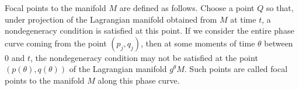 Focal points to the manifold $M$ are defined as follows. Choose a point $Q$ so that, under projection of the Lagrangian manifold obtained from $M$ at time $t$, a nondegeneracy condition is satisfied at this point. If we consider the entire phase curve coming from the point $(p_j, q_j)$, then at some moments of time $\theta$ between $0$ and $t$, the nondegeneracy condition may not be satisfied at the point $(p(\theta), q(\theta))$ of the Lagrangian manifold $g^\theta M$. Such points are called focal points to the manifold $M$ along this phase curve.
